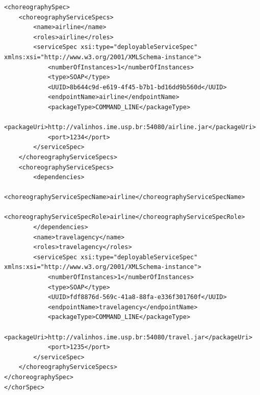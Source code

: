 \documentclass[a4paper, 10pt]{article}
\begin{document}
{\footnotesize

\lstset{language=XML}

\begin{lstlisting}[caption=ChorSpec XML representation example, label=lst:chor_spec_xml]
<choreographySpec>
    <choreographyServiceSpecs>
        <name>airline</name>
        <roles>airline</roles>
        <serviceSpec xsi:type="deployableServiceSpec" 
xmlns:xsi="http://www.w3.org/2001/XMLSchema-instance">
            <numberOfInstances>1</numberOfInstances>
            <type>SOAP</type>
            <UUID>8b644c9d-e619-4f45-b7b1-bd16dd9b560d</UUID>
            <endpointName>airline</endpointName>
            <packageType>COMMAND_LINE</packageType>
            <packageUri>http://valinhos.ime.usp.br:54080/airline.jar</packageUri>
            <port>1234</port>
        </serviceSpec>
    </choreographyServiceSpecs>
    <choreographyServiceSpecs>
        <dependencies>
            <choreographyServiceSpecName>airline</choreographyServiceSpecName>
            <choreographyServiceSpecRole>airline</choreographyServiceSpecRole>
        </dependencies>
        <name>travelagency</name>
        <roles>travelagency</roles>
        <serviceSpec xsi:type="deployableServiceSpec" 
xmlns:xsi="http://www.w3.org/2001/XMLSchema-instance">
            <numberOfInstances>1</numberOfInstances>
            <type>SOAP</type>
            <UUID>fdf8876d-569c-41a8-88fa-e336f301760f</UUID>
            <endpointName>travelagency</endpointName>
            <packageType>COMMAND_LINE</packageType>
            <packageUri>http://valinhos.ime.usp.br:54080/travel.jar</packageUri>
            <port>1235</port>
        </serviceSpec>
    </choreographyServiceSpecs>
</choreographySpec>
</chorSpec>
\end{lstlisting}

}
\end{document}
